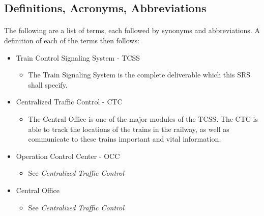 \documentclass{article}
\begin{document}
    \subsection{Definitions, Acronyms, Abbreviations}
    \paragraph{} The following are a list of terms, each followed by synonyms and abbreviations. A definition of each of the terms then follows:
    \begin{itemize}
        \item Train Control Signaling System - TCSS
            \begin{itemize}
            \item The Train Signaling System is the complete deliverable which this SRS  shall specify.
            \end{itemize}
        \item Centralized Traffic Control - CTC 
            \begin{itemize}
            \item The Central Office is one of the major modules of the TCSS. The CTC  is able to track the locations of the trains in the railway, as well as communicate to these trains important and vital information.
            \end{itemize}
        \item Operation Control Center - OCC
            \begin{itemize}
            \item See \emph{Centralized Traffic Control}
            \end{itemize}
        \item Central Office
            \begin{itemize}
            \item See \emph{Centralized Traffic Control}
            \end{itemize}


\end{itemize}
\end{document}
